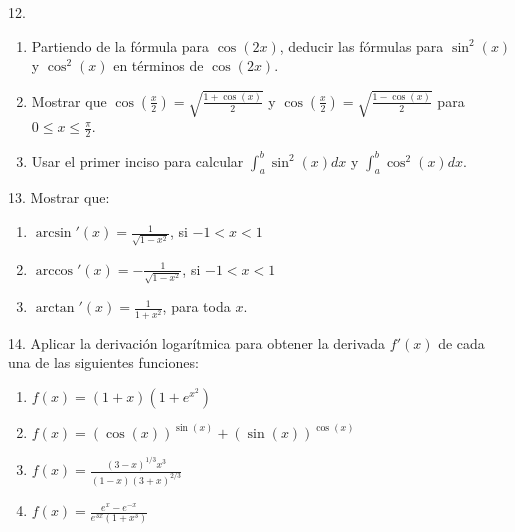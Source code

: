 \documentclass[12pt]{article}
\begin{document}
12.
\begin{enumerate}[\hspace{9px} a)]
    \item Partiendo de la f\'ormula para $\cos(2x)$, deducir las f\'ormulas para $\sin^2(x)$ y $\cos^2(x)$ en t\'erminos de $\cos(2x)$.

    \item Mostrar que \(\cos\left(\displaystyle\frac{x}{2}\right)=\sqrt{\frac{1+\cos(x)}{2}}\) y \(\cos\left(\displaystyle\frac{x}{2}\right)=\sqrt{\frac{1-\cos(x)}{2}}\) para \(0 \leq x \leq \displaystyle\frac{\pi}{2}\).

    \item Usar el primer inciso para calcular \(\displaystyle\int_{a}^{b}\sin^2(x)dx\) y \(\displaystyle\int_{a}^{b}\cos^2(x)dx\).

\end{enumerate}

13. Mostrar que:

\begin{enumerate}[\hspace{9px} a)]
    \item \(\arcsin'(x)=\displaystyle\frac{1}{\sqrt{1-x^2}}\), si \(-1<x<1\)

    \item \(\arccos'(x)=\displaystyle-\frac{1}{\sqrt{1-x^2}}\), si \(-1<x<1\)

    \item \(\arctan'(x)=\displaystyle\frac{1}{1+x^2}\), para toda $x$.

\end{enumerate}

14. Aplicar la derivaci\'on logar\'itmica para obtener la derivada $f'(x)$ de cada una de las siguientes funciones:

\begin{enumerate}[\hspace{9px} a)]
    \item \(f(x)=(1+x)(1+e^{x^2})\)

    \item \(f(x)=(\cos(x))^{\sin(x)}+(\sin(x))^{\cos(x)}\)

    \item \(f(x)=\displaystyle\frac{(3-x)^{1/3}x^3}{(1-x)(3+x)^{2/3}}\)

    \item \(f(x)=\displaystyle\frac{e^x-e^{-x}}{e^{3x}(1+x^3)}\)

\end{enumerate}
\end{document}
